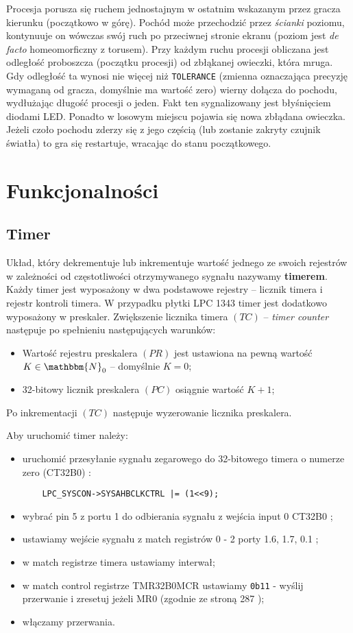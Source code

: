 \documentclass[a4paper,12pt,twoside]{article}
\newcommand{\N}{\mathbbm{N}}
\theoremstyle{plain}
\theoremstyle{definition}
\theoremstyle{remark}
\begin{document}
Procesja porusza się ruchem jednostajnym w ostatnim wskazanym przez gracza kierunku (początkowo w górę). Pochód może przechodzić przez \textit{ścianki} poziomu, kontynuuje on wówczas swój ruch po przeciwnej stronie ekranu (poziom jest \textit{de facto} homeomorficzny z torusem). Przy każdym ruchu procesji obliczana jest odległość proboszcza (początku procesji) od zbłąkanej owieczki, która mruga. Gdy odległość ta wynosi nie więcej niż \verb|TOLERANCE| (zmienna oznaczająca precyzję wymaganą od gracza, domyślnie ma wartość zero) wierny dołącza do pochodu, wydłużając długość procesji o jeden. Fakt ten sygnalizowany jest błyśnięciem diodami LED. Ponadto w losowym miejscu pojawia się nowa zbłądana owieczka. Jeżeli czoło pochodu zderzy się z jego częścią (lub zostanie zakryty czujnik światła) to gra się restartuje, wracając do stanu początkowego. 
\section{Funkcjonalności}
\subsection{Timer}
Układ, który dekrementuje lub inkrementuje wartość jednego ze swoich rejestrów w zależności od częstotliwości otrzymywanego sygnału nazywamy \textbf{timerem}. Każdy timer jest wyposażony w dwa podstawowe rejestry -- licznik timera i rejestr kontroli timera. W przypadku płytki LPC 1343 timer jest dodatkowo wyposażony w preskaler. Zwiększenie licznika timera $(TC)$ -- \textit{timer counter} następuje po spełnieniu następujących warunków:
\begin{itemize}
\item Wartość rejestru preskalera $(PR)$ jest ustawiona na pewną wartość $K\in \N_0$ -- domyślnie $K=0$;
\item 32-bitowy licznik preskalera $(PC)$ osiągnie wartość $K+1$;
\end{itemize}
Po inkrementacji $(TC)$ następuje wyzerowanie licznika preskalera.

Aby uruchomić timer należy:
\begin{itemize}
	\item uruchomić przesyłanie sygnału zegarowego do 32-bitowego timera o numerze zero (CT32B0) \cite{INST}: 
	\begin{verbatim}
	LPC_SYSCON->SYSAHBCLKCTRL |= (1<<9);
	\end{verbatim}
	\item wybrać pin 5 z portu 1 do odbierania sygnału z wejścia input 0 CT32B0 ;
	\item ustawiamy wejście sygnału z match registrów 0 - 2 porty 1.6, 1.7, 0.1 ;
	\item w match registrze timera ustawiamy interwał;
	\item w match control registrze TMR32B0MCR ustawiamy \verb|0b11| - wyślij przerwanie i zresetuj jeżeli MR0 (zgodnie ze stroną 287 \cite{INST});
	\item włączamy przerwania.
\end{itemize}
\end{document}
